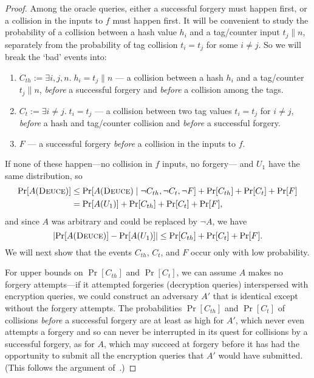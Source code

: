 \documentclass[draft]{article}
\DeclareRobustCommand{\operatorsc}[1]{{%
  \ifmmode\let\next=\operatorname\else\let\next=\relax\fi\next{\textsc{#1}}}}
\def\Deuce/{\operatorsc{Deuce}}
\newcommand{\concat}{\mathbin\|}
\newcommand{\given}{\mathrel|}
\begin{document}
\begin{proof}
Among the oracle queries, either a successful forgery must happen
 first, or a collision in the inputs to $f$ must happen first.
It will be convenient to study the probability of a collision between a
 hash value $h_i$ and a tag/counter input $t_j \concat n$, separately
 from the probability of tag collision $t_i = t_j$ for some $i \ne j$.
So we will break the `bad' events into:
%
\begin{enumerate}
  \item
    $C_{th} := \exists i, j, n.\; h_i = t_j \concat n$
    ---
     a collision between a hash $h_i$ and a tag/counter
     $t_j \concat n$,
     \emph{before} a successful forgery and
     \emph{before} a collision among the tags.
  \item
    $C_t := \exists i \ne j.\; t_i = t_j$
    ---
     a collision between two tag values $t_i = t_j$ for $i \ne j$,
     \emph{before} a hash and tag/counter collision and
     \emph{before} a successful forgery.
  \item
    $F$
    ---
     a successful forgery
     \emph{before} a collision in the inputs to $f$.
\end{enumerate}
%
If none of these happen---no collision in $f$ inputs, no
 forgery---\Deuce/ and $U_1$ have the same distribution, so
%
\begin{align*}
  \Pr[A(\Deuce/)]
  &\leq \Pr[A(\Deuce/) \given \lnot C_{th}, \lnot C_t, \lnot F]
     + \Pr[C_{th}] + \Pr[C_t] + \Pr[F] \\
  &= \Pr[A(U_1)] + \Pr[C_{th}] + \Pr[C_t] + \Pr[F],
\end{align*}
%
 and since $A$ was arbitrary and could be replaced by $\lnot A$, we
 have
\[
  \lvert\Pr[A(\Deuce/)] - \Pr[A(U_1)]\rvert
  \leq \Pr[C_{th}] + \Pr[C_t] + \Pr[F].
\]
We will next show that the events $C_{th}$, $C_t$, and $F$ occur only
 with low probability.

For upper bounds on $\Pr[C_{th}]$ and $\Pr[C_t]$, we can assume $A$
 makes no forgery attempts---if it attempted forgeries
 (decryption queries)
 interspersed with encryption queries, we could construct an adversary
 $A'$ that is identical except without the forgery attempts.
The probabilities $\Pr[C_{th}]$ and $\Pr[C_t]$ of collisions
 \emph{before} a successful forgery are at least as high for $A'$,
 which never even attempts a forgery and so can never be interrupted in
 its quest for collisions by a successful forgery, as for $A$, which
 may succeed at forgery before it has had the opportunity to submit all
 the encryption queries that $A'$ would have submitted.
(This follows the argument
 of~\cite[Theorem~1]{dodis-pietrzak2007randmac}.)


\end{proof}
\end{document}

